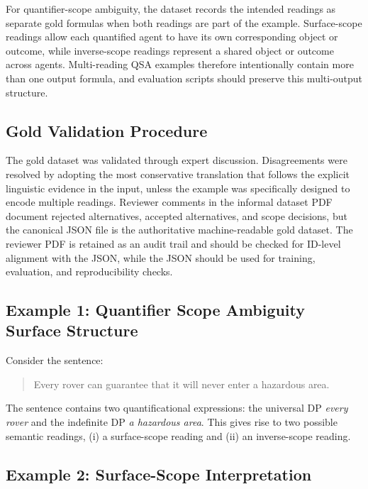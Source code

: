\documentclass[letterpaper]{article}
\begin{document}
For quantifier-scope ambiguity, the dataset records the intended readings as separate gold formulas when both readings are part of the example. Surface-scope readings allow each quantified agent to have its own corresponding object or outcome, while inverse-scope readings represent a shared object or outcome across agents. Multi-reading QSA examples therefore intentionally contain more than one output formula, and evaluation scripts should preserve this multi-output structure.

\subsection{Gold Validation Procedure}

The gold dataset was validated through expert discussion. Disagreements were resolved by adopting the most conservative translation that follows the explicit linguistic evidence in the input, unless the example was specifically designed to encode multiple readings. Reviewer comments in the informal dataset PDF document rejected alternatives, accepted alternatives, and scope decisions, but the canonical JSON file is the authoritative machine-readable gold dataset. The reviewer PDF is retained as an audit trail and should be checked for ID-level alignment with the JSON, while the JSON should be used for training, evaluation, and reproducibility checks.

\subsection{Example 1: Quantifier Scope Ambiguity Surface Structure}

\begin{example}
Consider the sentence:
\begin{quote}
Every rover can guarantee that it will never enter a hazardous area.
\end{quote}
The sentence contains two quantificational expressions: the universal DP \emph{every rover} and the indefinite DP \emph{a hazardous area}. This gives rise to two possible semantic readings, (i) a surface-scope reading and (ii) an inverse-scope reading.
\end{example}


\subsection{Example 2: Surface-Scope Interpretation}
\end{document}
